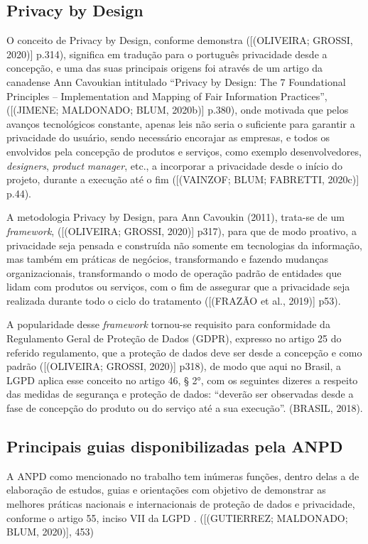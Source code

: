 \documentclass[
	12pt,				%
	openright,			%
	oneside,			%
	a4paper,			%
	english,			%
	french,				%
	spanish,			%
	brazil,				%
	]{abntex2}
\begin{document}
\subsection{ Privacy by Design  }

O conceito de Privacy by Design, conforme demonstra ([(OLIVEIRA; GROSSI, 2020)] p.314),  significa em tradução para o português privacidade desde a concepção, e uma das suas principais origens foi através de um artigo da canadense Ann Cavoukian intitulado “Privacy by Design: The 7 Foundational Principles – Implementation and Mapping of Fair Information Practices”, ([(JIMENE; MALDONADO; BLUM, 2020b)] p.380), onde motivada que pelos avanços tecnológicos constante, apenas leis não seria o suficiente para garantir a privacidade do usuário, sendo necessário encorajar as empresas, e todos os envolvidos pela concepção de produtos e serviços, como exemplo desenvolvedores, \textit{designers}, \textit{product} \textit{manager}, etc., a incorporar a privacidade desde o início do projeto, durante a execução até o fim ([(VAINZOF; BLUM; FABRETTI, 2020c)] p.44). 

A metodologia Privacy by Design, para Ann Cavoukin (2011), trata-se de um \textit{framework}, ([(OLIVEIRA; GROSSI, 2020)] p317),  para que de modo proativo, a privacidade seja pensada e construída não somente em tecnologias da informação, mas também em práticas de negócios, transformando e fazendo mudanças organizacionais, transformando o modo de operação padrão de entidades que lidam com produtos ou serviços, com o fim de assegurar que a privacidade seja realizada durante todo o ciclo do tratamento ([(FRAZÃO et al., 2019)] p53).

A popularidade desse \textit{framework} tornou-se requisito para conformidade da Regulamento Geral de Proteção de Dados (GDPR), expresso no artigo 25 do referido  regulamento, que a proteção de dados deve ser desde a concepção e como padrão ([(OLIVEIRA; GROSSI, 2020)] p318), de modo que aqui no Brasil, a LGPD aplica esse conceito no artigo 46, § 2°, com os seguintes dizeres a respeito das medidas de segurança e proteção de dados: “deverão ser observadas desde a fase de concepção do produto ou do serviço até a sua execução”. (BRASIL, 2018).

\subsection{ Principais guias disponibilizadas pela ANPD  }

A ANPD como mencionado no trabalho tem inúmeras funções, dentro delas a de elaboração de estudos, guias e orientações com objetivo de demonstrar as melhores práticas nacionais e internacionais de proteção de dados e privacidade, conforme o artigo 55, inciso VII da LGPD . ([(GUTIERREZ; MALDONADO; BLUM, 2020)], 453)
\end{document}
